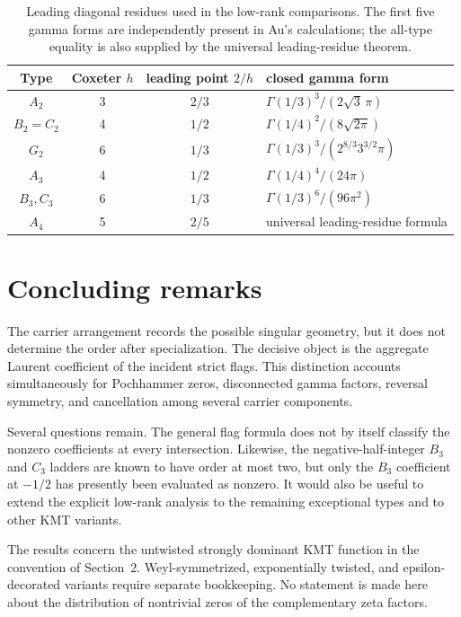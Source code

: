 \documentclass[11pt]{article}
\begin{document}
\begin{table}[ht]
\centering
\small
\begin{tabular}{@{}cccl@{}}
\toprule
Type & Coxeter \(h\) & leading point \(2/h\) & closed gamma form\\
\midrule
\(A_2\)&3&\(2/3\)&\(\Gamma(1/3)^3/(2\sqrt3\,\pi)\)\\
\(B_2=C_2\)&4&\(1/2\)&\(\Gamma(1/4)^2/(8\sqrt{2\pi})\)\\
\(G_2\)&6&\(1/3\)&\(\Gamma(1/3)^3/(2^{8/3}3^{3/2}\pi)\)\\
\(A_3\)&4&\(1/2\)&\(\Gamma(1/4)^4/(24\pi)\)\\
\(B_3,C_3\)&6&\(1/3\)&\(\Gamma(1/3)^6/(96\pi^2)\)\\
\(A_4\)&5&\(2/5\)& universal leading-residue formula\\
\bottomrule
\end{tabular}
\caption{Leading diagonal residues used in the low-rank comparisons.  The first
five gamma forms are independently present in Au's calculations; the
all-type equality is also supplied by the universal leading-residue
theorem.}
\label{tab:Au-leading-comparisons}
\end{table}

\section{Concluding remarks}

The carrier arrangement records the possible singular geometry, but it
does not determine the order after specialization.  The decisive
object is the aggregate Laurent coefficient of the incident strict
flags.  This distinction accounts simultaneously for Pochhammer
zeros, disconnected gamma factors, reversal symmetry, and
cancellation among several carrier components.

Several questions remain.  The general flag formula does not by
itself classify the nonzero coefficients at every intersection.
Likewise, the negative-half-integer \(B_3\) and \(C_3\) ladders are
known to have order at most two, but only the \(B_3\) coefficient at
\(-1/2\) has presently been evaluated as nonzero.  It would also be
useful to extend the explicit low-rank analysis to the remaining
exceptional types and to other KMT variants.

The results concern the untwisted strongly dominant KMT function in
the convention of Section~2.  Weyl-symmetrized, exponentially twisted,
and epsilon-decorated variants require separate bookkeeping.  No
statement is made here about the distribution of nontrivial zeros of
the complementary zeta factors.
\end{document}
